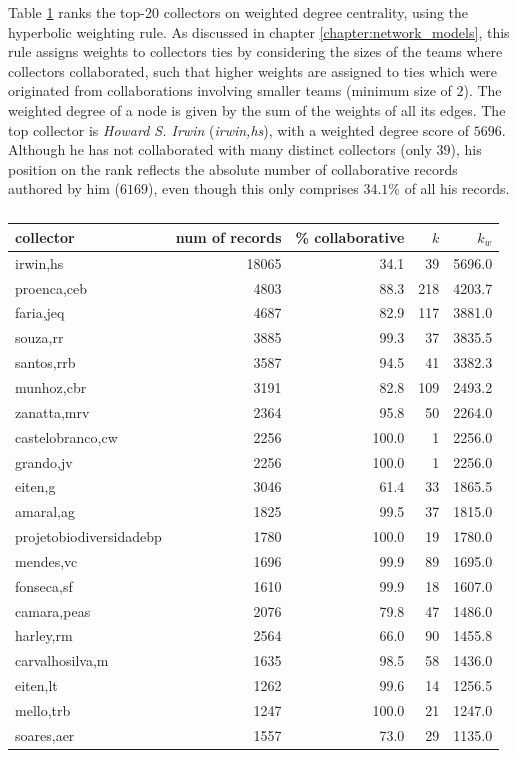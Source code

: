 Table \ref{table:ub_cwn_degree} ranks the top-20 collectors on weighted degree centrality, using the hyperbolic weighting rule.
As discussed in chapter \ref{chapter:network_models}, this rule assigns weights to collectors ties by considering the sizes of the teams where collectors collaborated, such that higher weights are assigned to ties which were originated from collaborations involving smaller teams (minimum size of $2$).
The weighted degree of a node is given by the sum of the weights of all its edges.
The top collector is \textit{Howard S. Irwin} (\textit{irwin,hs}), with a weighted degree score of $5696$.
Although he has not collaborated with many distinct collectors (only $39$), his position on the rank reflects the absolute number of collaborative records authored by him ($6169$), even though this only comprises $34.1\%$ of all his records. 
%
\begin{table}[H]
  \caption{}
  \begin{center}
  \begin{tabular}{l r r r r}
      collector & num of records & \% collaborative & $k$ & $k_w$ \\
      \hline
      irwin,hs & 18065 & 34.1 & 39 & 5696.0 \\
      proenca,ceb & 4803 & 88.3 & 218 & 4203.7 \\
      faria,jeq & 4687 & 82.9 & 117 & 3881.0 \\
      souza,rr & 3885 & 99.3 & 37 & 3835.5 \\
      santos,rrb & 3587 & 94.5 & 41 & 3382.3 \\
      munhoz,cbr & 3191 & 82.8 & 109 & 2493.2 \\
      zanatta,mrv & 2364 & 95.8 & 50 & 2264.0 \\
      castelobranco,cw & 2256 & 100.0 & 1 & 2256.0 \\
      grando,jv & 2256 & 100.0 & 1 & 2256.0 \\
      eiten,g & 3046 & 61.4 & 33 & 1865.5 \\
      amaral,ag & 1825 & 99.5 & 37 & 1815.0 \\
      projetobiodiversidadebp & 1780 & 100.0 & 19 & 1780.0 \\
      mendes,vc & 1696 & 99.9 & 89 & 1695.0 \\
      fonseca,sf & 1610 & 99.9 & 18 & 1607.0 \\
      camara,peas & 2076 & 79.8 & 47 & 1486.0 \\
      harley,rm & 2564 & 66.0 & 90 & 1455.8 \\
      carvalhosilva,m & 1635 & 98.5 & 58 & 1436.0 \\
      eiten,lt & 1262 & 99.6 & 14 & 1256.5 \\
      mello,trb & 1247 & 100.0 & 21 & 1247.0 \\
      soares,aer & 1557 & 73.0 & 29 & 1135.0 \\
      \hline
  \end{tabular}
  \label{table:ub_cwn_degree}
  \end{center}
\end{table}
